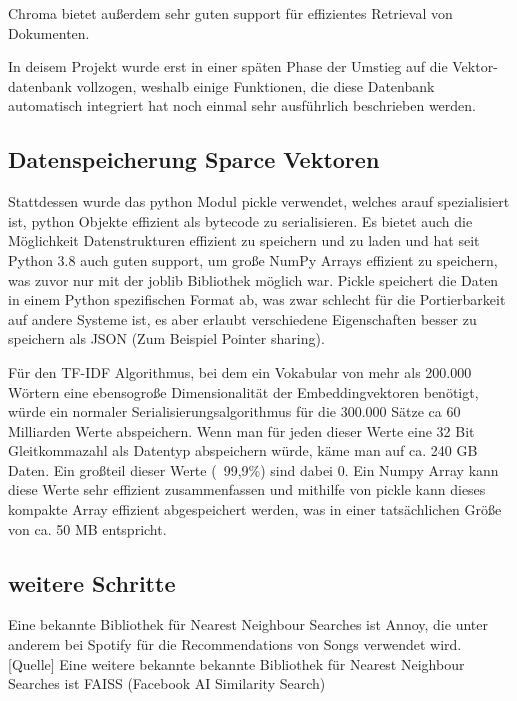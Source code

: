 Chroma bietet außerdem sehr guten support für effizientes Retrieval von Dokumenten.
 


In deisem Projekt wurde erst in einer späten Phase der Umstieg auf die Vektor-datenbank vollzogen, weshalb einige Funktionen, die diese Datenbank automatisch integriert hat noch einmal sehr ausführlich beschrieben werden.




\subsection{Datenspeicherung Sparce Vektoren}

Stattdessen wurde das python Modul pickle verwendet, welches arauf spezialisiert ist, python Objekte effizient als bytecode zu serialisieren. 
Es bietet auch die Möglichkeit Datenstrukturen effizient zu speichern und zu laden und hat seit Python 3.8 auch guten support, um große NumPy Arrays effizient zu speichern, was zuvor nur mit der joblib Bibliothek möglich war.
Pickle speichert die Daten in einem Python spezifischen Format ab, was zwar schlecht für die Portierbarkeit auf andere Systeme ist, es aber erlaubt verschiedene Eigenschaften besser zu speichern als JSON (Zum Beispiel Pointer sharing).

Für den TF-IDF Algorithmus, bei dem ein Vokabular von mehr als 200.000 Wörtern eine ebensogroße Dimensionalität der Embeddingvektoren benötigt, würde ein normaler Serialisierungsalgorithmus für die 300.000 Sätze ca 60 Milliarden Werte abspeichern.
Wenn man für jeden dieser Werte eine 32 Bit Gleitkommazahl als Datentyp abspeichern würde, käme man auf ca. 240 GB Daten. 
Ein großteil dieser Werte (~99,9\%) sind dabei 0.
Ein Numpy Array kann diese Werte sehr effizient zusammenfassen und mithilfe von pickle kann dieses kompakte Array effizient abgespeichert werden, was in einer tatsächlichen Größe von ca. 50 MB entspricht.

\subsection{weitere Schritte}


Eine bekannte Bibliothek für Nearest Neighbour Searches ist Annoy, die unter anderem bei Spotify für die Recommendations von Songs verwendet wird. [Quelle]
Eine weitere bekannte bekannte Bibliothek für Nearest Neighbour Searches ist FAISS (Facebook AI Similarity Search)

